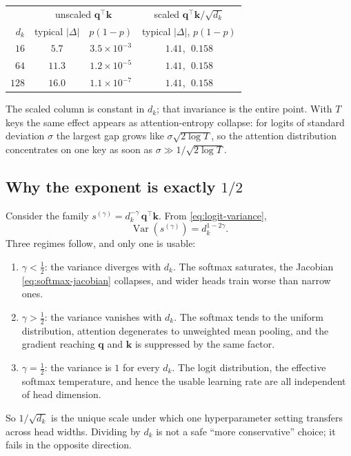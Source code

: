 \documentclass[11pt]{article}
\newcommand{\ve}[1]{\boldsymbol{#1}}
\newcommand{\tr}{\intercal}
\begin{document}
\begin{center}
\begin{tabular}{rccc}
\hline
 & \multicolumn{2}{c}{unscaled $\ve{q}^{\tr}\ve{k}$} & scaled $\ve{q}^{\tr}\ve{k}/\sqrt{d_k}$ \\
$d_k$ & typical $|\Delta|$ & $p(1-p)$ & typical $|\Delta|$, $p(1-p)$ \\
\hline
$16$  & $5.7$  & $3.5\times10^{-3}$ & $1.41$, $\;0.158$ \\
$64$  & $11.3$ & $1.2\times10^{-5}$ & $1.41$, $\;0.158$ \\
$128$ & $16.0$ & $1.1\times10^{-7}$ & $1.41$, $\;0.158$ \\
\hline
\end{tabular}
\end{center}

\noindent
The scaled column is constant in $d_k$; that invariance is the entire point. With $T$ keys the same
effect appears as attention-entropy collapse: for logits of standard deviation $\sigma$ the largest
gap grows like $\sigma\sqrt{2\log T}$, so the attention distribution concentrates on one key as soon
as $\sigma\gg 1/\sqrt{2\log T}$.

\subsection*{Why the exponent is exactly $1/2$}

Consider the family $s^{(\gamma)}=d_k^{-\gamma}\,\ve{q}^{\tr}\ve{k}$. From
\eqref{eq:logit-variance},
\[
  \operatorname{Var}\!\left(s^{(\gamma)}\right)=d_k^{1-2\gamma}.
\]
Three regimes follow, and only one is usable:
\begin{enumerate}[leftmargin=1.6em,itemsep=3pt]
  \item $\gamma<\tfrac12$: the variance diverges with $d_k$. The softmax saturates, the Jacobian
  \eqref{eq:softmax-jacobian} collapses, and wider heads train worse than narrow ones.

  \item $\gamma>\tfrac12$: the variance vanishes with $d_k$. The softmax tends to the uniform
  distribution, attention degenerates to unweighted mean pooling, and the gradient reaching
  $\ve{q}$ and $\ve{k}$ is suppressed by the same factor.

  \item $\gamma=\tfrac12$: the variance is $1$ for every $d_k$. The logit distribution, the
  effective softmax temperature, and hence the usable learning rate are all independent of head
  dimension.
\end{enumerate}
So $1/\sqrt{d_k}$ is the unique scale under which one hyperparameter setting transfers across head
widths. Dividing by $d_k$ is not a safe ``more conservative'' choice; it fails in the opposite
direction.
\end{document}
